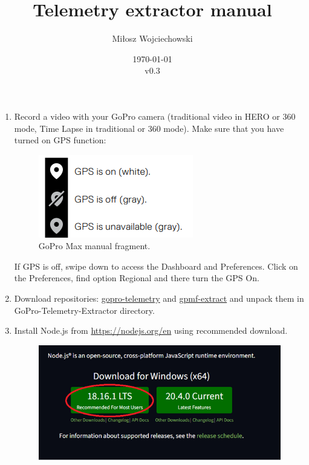 \documentclass[a4paper,12pt]{article}
\begin{document}
\author{Miłosz Wojciechowski}
\title{Telemetry extractor manual}
\date{\today\\ v0.3}


\maketitle
\pagebreak
{}
\renewcommand{\labelenumii}{\arabic{enumi}.\arabic{enumii}}

\begin{enumerate}
	\item Record a video with your GoPro camera (traditional video in HERO or 360 mode, Time Lapse in traditional or 360 mode). Make sure that you have turned on GPS function:
\begin{figure}[H]
	\centering
	\includegraphics{GoPro_manual_fragment}
	\caption{GoPro Max manual fragment.}
\end{figure}
	If GPS is off, swipe down to access the Dashboard and Preferences. Click on the Preferences, find option Regional and there turn the GPS On.\\
	\item Download repositories: \href{https://github.com/JuanIrache/gopro-telemetry}{gopro-telemetry} and \href{https://github.com/JuanIrache/gpmf-extract}{gpmf-extract} and unpack them in GoPro-Telemetry-Extractor directory.
	\item Install Node.js from \url{https://nodejs.org/en} using recommended download.
	\begin{figure}[H]
		\centering
		\includegraphics{nodejs_install}

\end{figure}
\end{enumerate}
\end{document}
